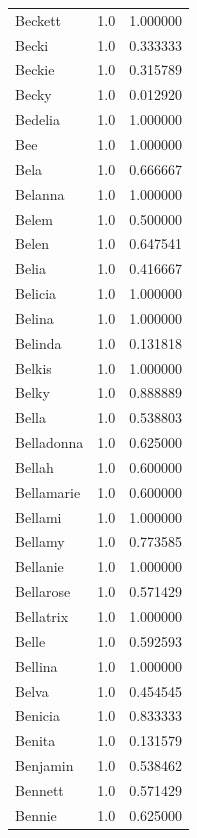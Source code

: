 \documentclass[
  letterpaper,
  DIV=11,
  numbers=noendperiod]{scrreprt}
\begin{document}
\begin{tabular}{lrr}
Beckett         &   1.0 &   1.000000 \\
Becki           &   1.0 &   0.333333 \\
Beckie          &   1.0 &   0.315789 \\
Becky           &   1.0 &   0.012920 \\
Bedelia         &   1.0 &   1.000000 \\
Bee             &   1.0 &   1.000000 \\
Bela            &   1.0 &   0.666667 \\
Belanna         &   1.0 &   1.000000 \\
Belem           &   1.0 &   0.500000 \\
Belen           &   1.0 &   0.647541 \\
Belia           &   1.0 &   0.416667 \\
Belicia         &   1.0 &   1.000000 \\
Belina          &   1.0 &   1.000000 \\
Belinda         &   1.0 &   0.131818 \\
Belkis          &   1.0 &   1.000000 \\
Belky           &   1.0 &   0.888889 \\
Bella           &   1.0 &   0.538803 \\
Belladonna      &   1.0 &   0.625000 \\
Bellah          &   1.0 &   0.600000 \\
Bellamarie      &   1.0 &   0.600000 \\
Bellami         &   1.0 &   1.000000 \\
Bellamy         &   1.0 &   0.773585 \\
Bellanie        &   1.0 &   1.000000 \\
Bellarose       &   1.0 &   0.571429 \\
Bellatrix       &   1.0 &   1.000000 \\
Belle           &   1.0 &   0.592593 \\
Bellina         &   1.0 &   1.000000 \\
Belva           &   1.0 &   0.454545 \\
Benicia         &   1.0 &   0.833333 \\
Benita          &   1.0 &   0.131579 \\
Benjamin        &   1.0 &   0.538462 \\
Bennett         &   1.0 &   0.571429 \\
Bennie          &   1.0 &   0.625000 \\

\end{tabular}
\end{document}
